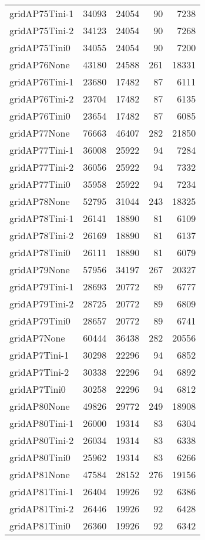 \begin{longtable}{lrrrr}
gridAP75Tini-1 & 34093 & 24054 & 90 & 7238 \\
gridAP75Tini-2 & 34123 & 24054 & 90 & 7268 \\
gridAP75Tini0 & 34055 & 24054 & 90 & 7200 \\
gridAP76None & 43180 & 24588 & 261 & 18331 \\
gridAP76Tini-1 & 23680 & 17482 & 87 & 6111 \\
gridAP76Tini-2 & 23704 & 17482 & 87 & 6135 \\
gridAP76Tini0 & 23654 & 17482 & 87 & 6085 \\
gridAP77None & 76663 & 46407 & 282 & 21850 \\
gridAP77Tini-1 & 36008 & 25922 & 94 & 7284 \\
gridAP77Tini-2 & 36056 & 25922 & 94 & 7332 \\
gridAP77Tini0 & 35958 & 25922 & 94 & 7234 \\
gridAP78None & 52795 & 31044 & 243 & 18325 \\
gridAP78Tini-1 & 26141 & 18890 & 81 & 6109 \\
gridAP78Tini-2 & 26169 & 18890 & 81 & 6137 \\
gridAP78Tini0 & 26111 & 18890 & 81 & 6079 \\
gridAP79None & 57956 & 34197 & 267 & 20327 \\
gridAP79Tini-1 & 28693 & 20772 & 89 & 6777 \\
gridAP79Tini-2 & 28725 & 20772 & 89 & 6809 \\
gridAP79Tini0 & 28657 & 20772 & 89 & 6741 \\
gridAP7None & 60444 & 36438 & 282 & 20556 \\
gridAP7Tini-1 & 30298 & 22296 & 94 & 6852 \\
gridAP7Tini-2 & 30338 & 22296 & 94 & 6892 \\
gridAP7Tini0 & 30258 & 22296 & 94 & 6812 \\
gridAP80None & 49826 & 29772 & 249 & 18908 \\
gridAP80Tini-1 & 26000 & 19314 & 83 & 6304 \\
gridAP80Tini-2 & 26034 & 19314 & 83 & 6338 \\
gridAP80Tini0 & 25962 & 19314 & 83 & 6266 \\
gridAP81None & 47584 & 28152 & 276 & 19156 \\
gridAP81Tini-1 & 26404 & 19926 & 92 & 6386 \\
gridAP81Tini-2 & 26446 & 19926 & 92 & 6428 \\
gridAP81Tini0 & 26360 & 19926 & 92 & 6342 \\

\end{longtable}
